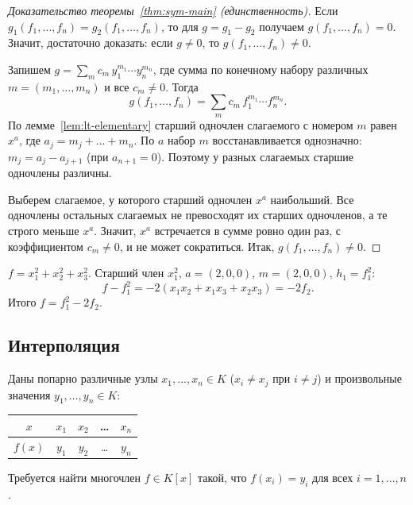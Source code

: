 \documentclass[12pt]{article}
\begin{document}
	\begin{proof}[Доказательство теоремы~\ref{thm:sym-main} (единственность)]
    	Если $g_1(f_1, \dots, f_n) = g_2(f_1, \dots, f_n)$, то для $g = g_1 - g_2$ получаем $g(f_1, \dots, f_n) = 0$. Значит, достаточно доказать: если $g \ne 0$, то $g(f_1, \dots, f_n) \ne 0$.

    	Запишем $g = \sum_m c_m\, y_1^{m_1} \cdots y_n^{m_n}$, где сумма по конечному набору различных $m = (m_1, \dots, m_n)$ и все $c_m \ne 0$. Тогда
    	\[
    		g(f_1, \dots, f_n) = \sum_m c_m\, f_1^{m_1} \cdots f_n^{m_n}.
    	\]
    	По лемме~\ref{lem:lt-elementary} старший одночлен слагаемого с номером $m$ равен $x^a$, где $a_j = m_j + \dots + m_n$. По $a$ набор $m$ восстанавливается однозначно: $m_j = a_j - a_{j+1}$ (при $a_{n+1} = 0$). Поэтому у разных слагаемых старшие одночлены различны.

    	Выберем слагаемое, у которого старший одночлен $x^a$ наибольший. Все одночлены остальных слагаемых не превосходят их старших одночленов, а те строго меньше $x^a$. Значит, $x^a$ встречается в сумме ровно один раз, с коэффициентом $c_m \ne 0$, и не может сократиться. Итак, $g(f_1, \dots, f_n) \ne 0$.
    \end{proof}

    \begin{example}
    	$f = x_1^2 + x_2^2 + x_3^2$. Старший член $x_1^2$, $a = (2, 0, 0)$, $m = (2, 0, 0)$, $h_1 = f_1^2$:
    	\[
    		f - f_1^2 = -2(x_1 x_2 + x_1 x_3 + x_2 x_3) = -2 f_2.
    	\]
    	Итого $f = f_1^2 - 2 f_2$.
    \end{example}
    
    \subsection{Интерполяция}

	\begin{problem}\label{prob:interpolation}
		Даны попарно различные узлы $x_1, \dots, x_n \in K$ ($x_i \ne x_j$ при $i \ne j$) и произвольные значения $y_1, \dots, y_n \in K$:
		\begin{center}
			\begin{tabular}{c|c|c|c|c}
				$x$ & $x_1$ & $x_2$ & \dots & $x_n$ \\
				\hline
				$f(x)$ & $y_1$ & $y_2$ & \dots & $y_n$
			\end{tabular}
		\end{center}
		Требуется найти многочлен $f \in K[x]$ такой, что $f(x_i) = y_i$ для всех $i = 1, \dots, n$.
	\end{problem}
\end{document}
